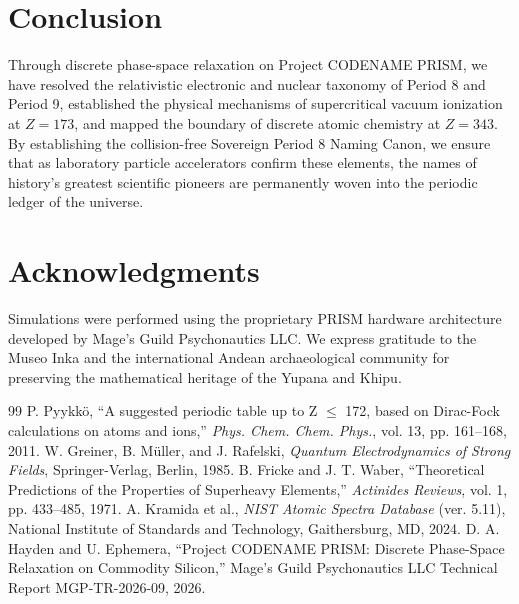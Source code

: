 \documentclass[10pt,twocolumn,a4paper]{article}
\begin{document}
\section{Conclusion}
Through discrete phase-space relaxation on Project CODENAME PRISM, we have resolved the relativistic electronic and nuclear taxonomy of Period 8 and Period 9, established the physical mechanisms of supercritical vacuum ionization at $Z = 173$, and mapped the boundary of discrete atomic chemistry at $Z = 343$. By establishing the collision-free Sovereign Period 8 Naming Canon, we ensure that as laboratory particle accelerators confirm these elements, the names of history's greatest scientific pioneers are permanently woven into the periodic ledger of the universe.

\section*{Acknowledgments}
Simulations were performed using the proprietary PRISM hardware architecture developed by Mage's Guild Psychonautics LLC. We express gratitude to the Museo Inka and the international Andean archaeological community for preserving the mathematical heritage of the Yupana and Khipu.

\begin{thebibliography}{99}
 P. Pyykk\"o, ``A suggested periodic table up to Z $\le$ 172, based on Dirac-Fock calculations on atoms and ions,'' \textit{Phys. Chem. Chem. Phys.}, vol. 13, pp. 161--168, 2011.
 W. Greiner, B. M\"uller, and J. Rafelski, \textit{Quantum Electrodynamics of Strong Fields}, Springer-Verlag, Berlin, 1985.
 B. Fricke and J. T. Waber, ``Theoretical Predictions of the Properties of Superheavy Elements,'' \textit{Actinides Reviews}, vol. 1, pp. 433--485, 1971.
 A. Kramida et al., \textit{NIST Atomic Spectra Database} (ver. 5.11), National Institute of Standards and Technology, Gaithersburg, MD, 2024.
 D. A. Hayden and U. Ephemera, ``Project CODENAME PRISM: Discrete Phase-Space Relaxation on Commodity Silicon,'' Mage's Guild Psychonautics LLC Technical Report MGP-TR-2026-09, 2026.
\end{thebibliography}
\end{document}
